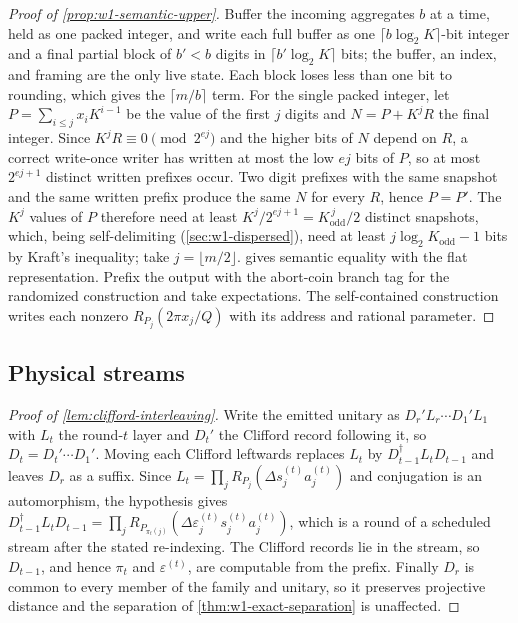 \begin{proof}[Proof of \cref{prop:w1-semantic-upper}]
Buffer the incoming aggregates $b$ at a time, held as one packed integer,
and write each full buffer as one $\lceil b\log_2K\rceil$-bit integer and
a final partial block of $b'<b$ digits in $\lceil b'\log_2K\rceil$ bits;
the buffer, an index, and framing are the only live state.  Each block loses less than one bit to rounding,
which gives the $\lceil m/b\rceil$ term.  For the single packed integer,
let $P=\sum_{i\leq j}x_iK^{i-1}$ be the value of the first $j$ digits and
$N=P+K^jR$ the final integer.  Since $K^jR\equiv0\pmod{2^{ej}}$ and the
higher bits of $N$ depend on $R$, a correct write-once writer has written at
most the low $ej$ bits of $P$, so at most $2^{ej+1}$ distinct written
prefixes occur.  Two digit prefixes with the same snapshot and the same
written prefix produce the same $N$ for every $R$, hence $P=P'$.  The
$K^j$ values of $P$ therefore need at least $K^j/2^{ej+1}=K_{\mathrm{odd}}^{\,j}/2$
distinct snapshots, which, being self-delimiting
(\cref{sec:w1-dispersed}), need at least
$j\log_2K_{\mathrm{odd}}-1$ bits by Kraft's inequality; take
$j=\lfloor m/2\rfloor$.   gives
semantic equality with the flat representation.  Prefix the output with the
abort-coin branch tag for the randomized construction and take
expectations.  The self-contained construction writes each nonzero
$R_{P_j}(2\pi x_j/Q)$ with its address and rational parameter.
\end{proof}

\subsection{Physical streams}

\begin{proof}[Proof of \cref{lem:clifford-interleaving}]
Write the emitted unitary as $D_r'L_r\cdots D_1'L_1$ with $L_t$ the
round-$t$ layer and $D_t'$ the Clifford record following it, so
$D_t=D_t'\cdots D_1'$.  Moving each Clifford leftwards replaces $L_t$ by
$D_{t-1}^\dagger L_tD_{t-1}$ and leaves $D_r$ as a suffix.  Since
$L_t=\prod_jR_{P_j}(\Delta s_j^{(t)}a_j^{(t)})$ and conjugation is an
automorphism, the hypothesis gives
$D_{t-1}^\dagger L_tD_{t-1}
=\prod_jR_{P_{\pi_t(j)}}(\Delta\varepsilon_j^{(t)}s_j^{(t)}a_j^{(t)})$,
which is a round of a scheduled stream after the stated
re-indexing.  The Clifford records lie in the stream, so $D_{t-1}$, and
hence $\pi_t$ and $\varepsilon^{(t)}$, are computable from the prefix.
Finally $D_r$ is common to every member of the family and unitary, so it
preserves projective distance and the separation of
\cref{thm:w1-exact-separation} is unaffected.
\end{proof}

